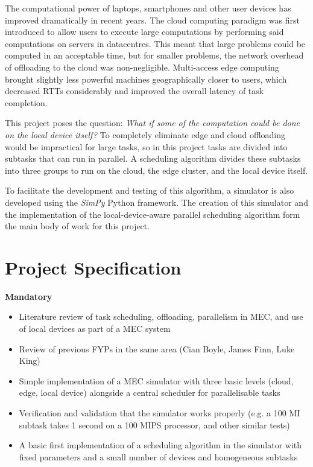 \documentclass[]{UCD_CS_FYP_Report}
\begin{document}
\maketitle


\tableofcontents


\abstract
The computational power of laptops, smartphones and other user devices has improved dramatically in recent years. The cloud computing paradigm was first introduced to allow users to execute large computations by performing said computations on servers in datacentres. This meant that large problems could be computed in an acceptable time, but for smaller problems, the network overhead of offloading to the cloud was non-negligible. Multi-access edge computing brought slightly less powerful machines geographically closer to users, which decreased RTTs considerably and improved the overall latency of task completion. 

This project poses the question: \textit{What if some of the computation could be done on the local device itself?} To completely eliminate edge and cloud offloading would be impractical for large tasks, so in this project tasks are divided into subtasks that can run in parallel. A scheduling algorithm divides these subtasks into three groups to run on the cloud, the edge cluster, and the local device itself.

To facilitate the development and testing of this algorithm, a simulator is also developed using the \textit{SimPy} Python framework. The creation of this simulator and the implementation of the local-device-aware parallel scheduling algorithm form the main body of work for this project.


\chapter{Project Specification}
\textbf{Mandatory}
\vspace{-1.5em}
\begin{itemize}
    \item Literature review of task scheduling, offloading, parallelism in MEC, and use of local devices as part of a MEC system
    \item Review of previous FYPs in the same area (Cian Boyle, James Finn, Luke King)
    \item Simple implementation of a MEC simulator with three basic levels (cloud, edge, local device) alongside a central scheduler for parallelisable tasks
    \item Verification and validation that the simulator works properly (e.g. a 100 MI subtask takes 1 second on a 100 MIPS processor, and other similar tests)
    \item A basic first implementation of a scheduling algorithm in the simulator with fixed parameters and a small number of devices and homogeneous subtasks
\end{itemize}
\vspace{-0.5em}
\end{document}
